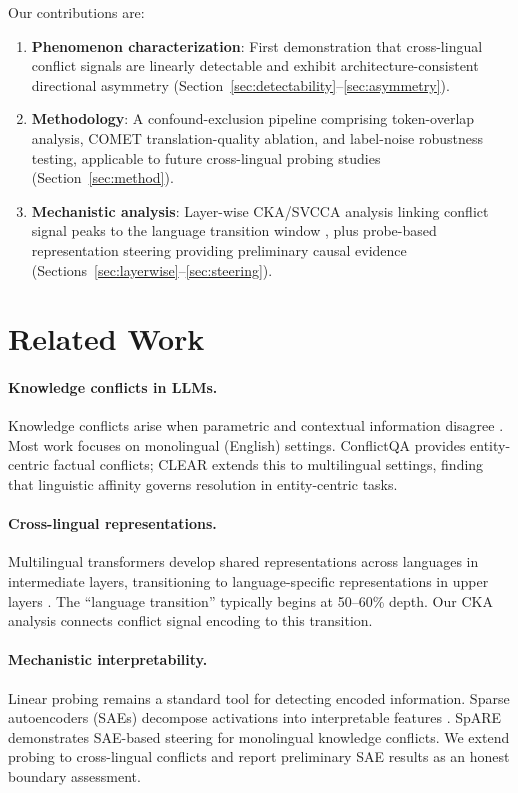 \documentclass{article}
\begin{document}
Our contributions are:
\begin{enumerate}
    \item \textbf{Phenomenon characterization}: First demonstration that cross-lingual conflict signals are linearly detectable and exhibit architecture-consistent directional asymmetry (Section~\ref{sec:detectability}--\ref{sec:asymmetry}).
    \item \textbf{Methodology}: A confound-exclusion pipeline comprising token-overlap analysis, COMET translation-quality ablation, and label-noise robustness testing, applicable to future cross-lingual probing studies (Section~\ref{sec:method}).
    \item \textbf{Mechanistic analysis}: Layer-wise CKA/SVCCA analysis linking conflict signal peaks to the language transition window \citep{wendler2024lost}, plus probe-based representation steering providing preliminary causal evidence (Sections~\ref{sec:layerwise}--\ref{sec:steering}).
\end{enumerate}

\section{Related Work}

\paragraph{Knowledge conflicts in LLMs.}
Knowledge conflicts arise when parametric and contextual information disagree \citep{longpre2021entity,chen2022rich,xie2024adaptive}. Most work focuses on monolingual (English) settings. ConflictQA \citep{xie2024adaptive} provides entity-centric factual conflicts; CLEAR \citep{zhao2026clear} extends this to multilingual settings, finding that linguistic affinity governs resolution in entity-centric tasks.

\paragraph{Cross-lingual representations.}
Multilingual transformers develop shared representations across languages in intermediate layers, transitioning to language-specific representations in upper layers \citep{pires2019multilingual,chi2020finding,wendler2024lost}. The ``language transition'' typically begins at 50--60\% depth. Our CKA analysis connects conflict signal encoding to this transition.

\paragraph{Mechanistic interpretability.}
Linear probing \citep{belinkov2022probing} remains a standard tool for detecting encoded information. Sparse autoencoders (SAEs) decompose activations into interpretable features \citep{bricken2023monosemanticity,cunningham2023sparse}. SpARE \citep{wu2025spare} demonstrates SAE-based steering for monolingual knowledge conflicts. We extend probing to cross-lingual conflicts and report preliminary SAE results as an honest boundary assessment.
\end{document}
